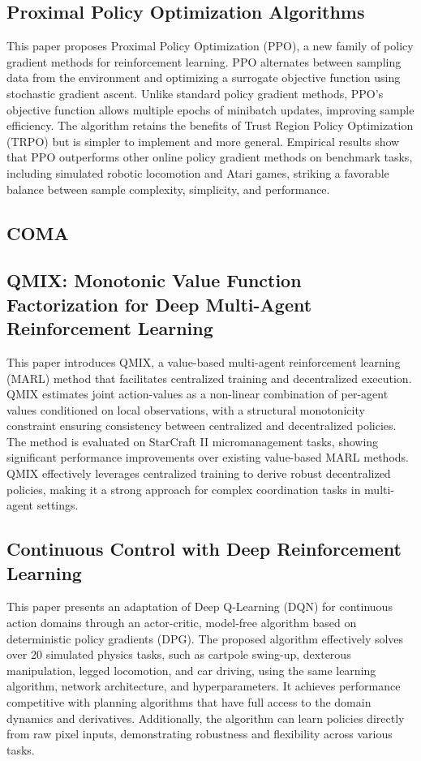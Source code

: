 \documentclass[journal]{IEEEtran}
\begin{document}
\subsection{Proximal Policy Optimization Algorithms}
This paper proposes Proximal Policy Optimization (PPO), a new family of policy gradient methods for reinforcement learning. PPO alternates between sampling data from the environment and optimizing a surrogate objective function using stochastic gradient ascent. Unlike standard policy gradient methods, PPO's objective function allows multiple epochs of minibatch updates, improving sample efficiency. The algorithm retains the benefits of Trust Region Policy Optimization (TRPO) but is simpler to implement and more general. Empirical results show that PPO outperforms other online policy gradient methods on benchmark tasks, including simulated robotic locomotion and Atari games, striking a favorable balance between sample complexity, simplicity, and performance.
\cite{schulman2017a}

\subsection{COMA}
\cite{foerster2018}

\subsection{QMIX: Monotonic Value Function Factorization for Deep Multi-Agent Reinforcement Learning}
This paper introduces QMIX, a value-based multi-agent reinforcement learning (MARL) method that facilitates centralized training and decentralized execution. QMIX estimates joint action-values as a non-linear combination of per-agent values conditioned on local observations, with a structural monotonicity constraint ensuring consistency between centralized and decentralized policies. The method is evaluated on StarCraft II micromanagement tasks, showing significant performance improvements over existing value-based MARL methods. QMIX effectively leverages centralized training to derive robust decentralized policies, making it a strong approach for complex coordination tasks in multi-agent settings.
\cite{rashid2018}

\subsection{Continuous Control with Deep Reinforcement Learning}
This paper presents an adaptation of Deep Q-Learning (DQN) for continuous action domains through an actor-critic, model-free algorithm based on deterministic policy gradients (DPG). The proposed algorithm effectively solves over 20 simulated physics tasks, such as cartpole swing-up, dexterous manipulation, legged locomotion, and car driving, using the same learning algorithm, network architecture, and hyperparameters. It achieves performance competitive with planning algorithms that have full access to the domain dynamics and derivatives. Additionally, the algorithm can learn policies directly from raw pixel inputs, demonstrating robustness and flexibility across various tasks.
\cite{lillicrap2019}
\end{document}
